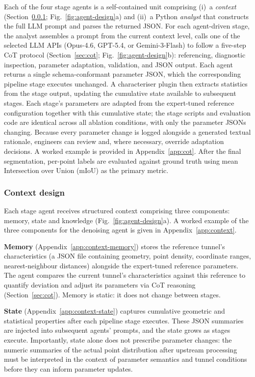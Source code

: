 \documentclass[a4paper,fleqn]{cas-dc}
\begin{document}
Each of the four stage agents is a self-contained unit comprising (i)~a \emph{context} (Section~\ref{sec:context-comp}; Fig.~\ref{fig:agent-design}a) and (ii)~a Python \textit{analyst} that constructs the full LLM prompt and parses the returned JSON. For each agent-driven stage, the analyst assembles a prompt from the current context level, calls one of the selected LLM APIs (Opus-4.6, GPT-5.4, or Gemini-3-Flash) to follow a five-step CoT protocol (Section~\ref{sec:cot}; Fig.~\ref{fig:agent-design}b): referencing, diagnostic inspection, parameter adaptation, validation, and JSON output. Each agent returns a single schema-conformant parameter JSON, which the corresponding pipeline stage executes unchanged. A characteriser plugin then extracts statistics from the stage output, updating the cumulative state available to subsequent stages. Each stage's parameters are adapted from the expert-tuned reference configuration together with this cumulative state; the stage scripts and evaluation code are identical across all ablation conditions, with only the parameter JSONs changing. Because every parameter change is logged alongside a generated textual rationale, engineers can review and, where necessary, override adaptation decisions. A worked example is provided in Appendix~\ref{app:cot}. After the final segmentation, per-point labels are evaluated against ground truth using mean Intersection over Union (mIoU) as the primary metric.




\subsubsection{Context design}\label{sec:context-comp}

Each stage agent receives structured context comprising three components: memory, state and knowledge (Fig.~\ref{fig:agent-design}a). A worked example of the three components for the denoising agent is given in Appendix~\ref{app:context}.

\textbf{Memory} (Appendix~\ref{app:context-memory}) stores the reference tunnel's characteristics (a JSON file containing geometry, point density, coordinate ranges, nearest-neighbour distances) alongside the expert-tuned reference parameters. The agent compares the current tunnel's characteristics against this reference to quantify deviation and adjust its parameters via CoT reasoning (Section~\ref{sec:cot}). Memory is static: it does not change between stages.


\textbf{State} (Appendix~\ref{app:context-state}) captures cumulative geometric and statistical properties after each pipeline stage executes. These JSON summaries are injected into subsequent agents' prompts, and the state grows as stages execute. Importantly, state alone does not prescribe parameter changes: the numeric summaries of the actual point distribution after upstream processing must be interpreted in the context of parameter semantics and tunnel conditions before they can inform parameter updates.
\end{document}
